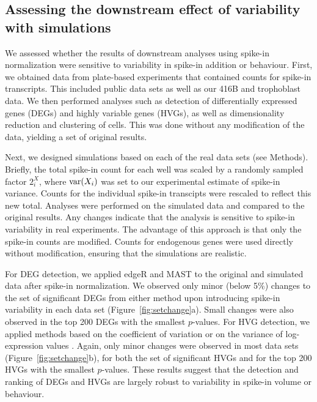 \documentclass{article}
\begin{document}
\subsection{Assessing the downstream effect of variability with simulations}
We assessed whether the results of downstream analyses using spike-in normalization were sensitive to variability in spike-in addition or behaviour.
First, we obtained data from plate-based experiments that contained counts for spike-in transcripts.
This included public data sets \cite{segerstople2016single,islam2011characterization,wilson2015combined} as well as our 416B and trophoblast data.
We then performed analyses such as detection of differentially expressed genes (DEGs) and highly variable genes (HVGs), as well as dimensionality reduction and clustering of cells.
This was done without any modification of the data, yielding a set of original results.

Next, we designed simulations based on each of the real data sets (see Methods).
Briefly, the total spike-in count for each well was scaled by a randomly sampled factor $2^X_i$, where $\mbox{var}(X_i)$ was set to our experimental estimate of spike-in variance.
Counts for the individual spike-in transcipts were rescaled to reflect this new total.
Analyses were performed on the simulated data and compared to the original results.
Any changes indicate that the analysis is sensitive to spike-in variability in real experiments.
The advantage of this approach is that only the spike-in counts are modified.
Counts for endogenous genes were used directly without modification, ensuring that the simulations are realistic.

For DEG detection, we applied edgeR \cite{robinson2010edgeR} and MAST \cite{finak2015mast} to the original and simulated data after spike-in normalization.
We observed only minor (below 5\%) changes to the set of significant DEGs from either method upon introducing spike-in variability in each data set (Figure~\ref{fig:setchange}a). 
Small changes were also observed in the top 200 DEGs with the smallest $p$-values.
For HVG detection, we applied methods based on the coefficient of variation \cite{brennecke2013accounting} or on the variance of log-expression values \cite{lun2016stepbystep}.
Again, only minor changes were observed in most data sets (Figure~\ref{fig:setchange}b), for both the set of significant HVGs and for the top 200 HVGs with the smallest $p$-values.
These results suggest that the detection and ranking of DEGs and HVGs are largely robust to variability in spike-in volume or behaviour.
\end{document}
